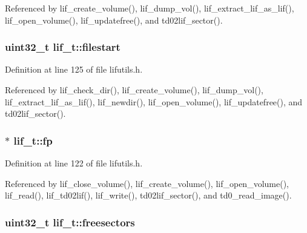 Referenced by lif\+\_\+create\+\_\+volume(), lif\+\_\+dump\+\_\+vol(), lif\+\_\+extract\+\_\+lif\+\_\+as\+\_\+lif(), lif\+\_\+open\+\_\+volume(), lif\+\_\+updatefree(), and td02lif\+\_\+sector().

\subsubsection[{\texorpdfstring{filestart}{filestart}}]{\setlength{\rightskip}{0pt plus 5cm}uint32\+\_\+t lif\+\_\+t\+::filestart}\hypertarget{structlif__t_a3c1bcc66b694d07ebc304ef7cb66b4ef}{}\label{structlif__t_a3c1bcc66b694d07ebc304ef7cb66b4ef}


Definition at line 125 of file lifutils.\+h.



Referenced by lif\+\_\+check\+\_\+dir(), lif\+\_\+create\+\_\+volume(), lif\+\_\+dump\+\_\+vol(), lif\+\_\+extract\+\_\+lif\+\_\+as\+\_\+lif(), lif\+\_\+newdir(), lif\+\_\+open\+\_\+volume(), lif\+\_\+updatefree(), and td02lif\+\_\+sector().

\subsubsection[{\texorpdfstring{fp}{fp}}]{$\ast$ lif\+\_\+t\+::fp}\hypertarget{structlif__t_ad679ba16ca21371a649981a4cca9e64c}{}\label{structlif__t_ad679ba16ca21371a649981a4cca9e64c}


Definition at line 122 of file lifutils.\+h.



Referenced by lif\+\_\+close\+\_\+volume(), lif\+\_\+create\+\_\+volume(), lif\+\_\+open\+\_\+volume(), lif\+\_\+read(), lif\+\_\+td02lif(), lif\+\_\+write(), td02lif\+\_\+sector(), and td0\+\_\+read\+\_\+image().

\subsubsection[{\texorpdfstring{freesectors}{freesectors}}]{\setlength{\rightskip}{0pt plus 5cm}uint32\+\_\+t lif\+\_\+t\+::freesectors}\hypertarget{structlif__t_a1fc11461eb5643d84e229772f7623152}{}\label{structlif__t_a1fc11461eb5643d84e229772f7623152}


